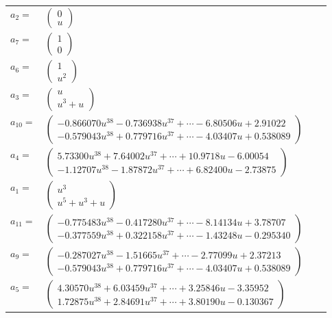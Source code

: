 \documentclass[1p]{elsarticle_modified}
\theoremstyle{definition}
\begin{document}
\begin{tabular}{m{7pt} m{180pt} m{7pt} m{180pt} }
\flushright $a_{2}=$&$\begin{pmatrix}0\\u\end{pmatrix}$ \\
\flushright $a_{7}=$&$\begin{pmatrix}1\\0\end{pmatrix}$ \\
\flushright $a_{6}=$&$\begin{pmatrix}1\\u^2\end{pmatrix}$ \\
\flushright $a_{3}=$&$\begin{pmatrix}u\\u^3+u\end{pmatrix}$ \\
\flushright $a_{10}=$&$\begin{pmatrix}-0.866070 u^{38}-0.736938 u^{37}+\cdots-6.80506 u+2.91022\\-0.579043 u^{38}+0.779716 u^{37}+\cdots-4.03407 u+0.538089\end{pmatrix}$ \\
\flushright $a_{4}=$&$\begin{pmatrix}5.73300 u^{38}+7.64002 u^{37}+\cdots+10.9718 u-6.00054\\-1.12707 u^{38}-1.87872 u^{37}+\cdots+6.82400 u-2.73875\end{pmatrix}$ \\
\flushright $a_{1}=$&$\begin{pmatrix}u^3\\u^5+u^3+u\end{pmatrix}$ \\
\flushright $a_{11}=$&$\begin{pmatrix}-0.775483 u^{38}-0.417280 u^{37}+\cdots-8.14134 u+3.78707\\-0.377559 u^{38}+0.322158 u^{37}+\cdots-1.43248 u-0.295340\end{pmatrix}$ \\
\flushright $a_{9}=$&$\begin{pmatrix}-0.287027 u^{38}-1.51665 u^{37}+\cdots-2.77099 u+2.37213\\-0.579043 u^{38}+0.779716 u^{37}+\cdots-4.03407 u+0.538089\end{pmatrix}$ \\
\flushright $a_{5}=$&$\begin{pmatrix}4.30570 u^{38}+6.03459 u^{37}+\cdots+3.25846 u-3.35952\\1.72875 u^{38}+2.84691 u^{37}+\cdots+3.80190 u-0.130367\end{pmatrix}$ \\

\end{tabular}
\end{document}
